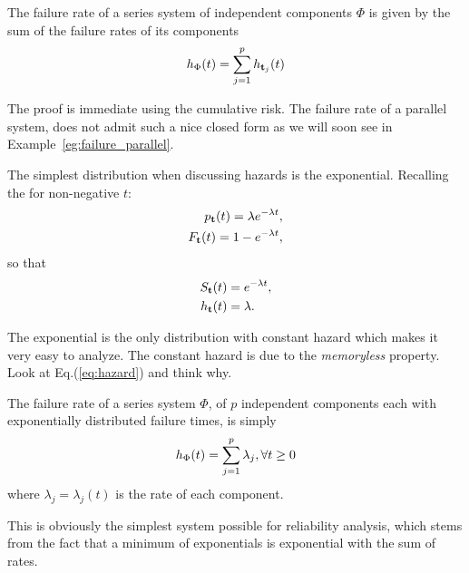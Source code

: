 \begin{theorem}
\label{thm:ifr_closure}
The failure rate of a series system of independent components $\Phi$ is given by the sum of the failure rates of its components
\begin{align}
	h_{\Phi} (t)= \sum_{j=1}^{p} h_{\mathbf{t}_j} (t)
\end{align}
\end{theorem}
The proof is immediate using the cumulative risk.
The failure rate of a parallel system, does not admit such a nice closed form as we will soon see in Example~\ref{eg:failure_parallel}.




\begin{example}
The simplest distribution when discussing hazards is the exponential.
Recalling the for non-negative $t$:
\begin{align}
	p_{\mathbf{t}} (t)= \lambda e^{-\lambda t}, \\
	F_{\mathbf{t}} (t)= 1-e^{-\lambda t},
\end{align}
so that 
\begin{align}
	S_{\mathbf{t}} (t) &= e^{-\lambda t}, \\
	h_{\mathbf{t}} (t) &= \lambda.
\end{align}
\end{example}
The exponential is the only distribution with constant hazard which makes it very easy to analyze.
The constant hazard is due to the \emph{memoryless} property. Look at Eq.(\ref{eq:hazard}) and think why.



\begin{example}
The failure rate of a series system $\Phi$, of $p$ independent components each with exponentially distributed failure times, is simply 
\begin{align}
	h_{\Phi} (t)= \sum_{j=1}^{p} \lambda_j, \forall t \geq 0
\end{align}
where $\lambda_j=\lambda_j(t)$ is the rate of each component.
\end{example}
This is obviously the simplest system possible for reliability analysis, which stems from the fact that a minimum of exponentials is exponential with the sum of rates.



